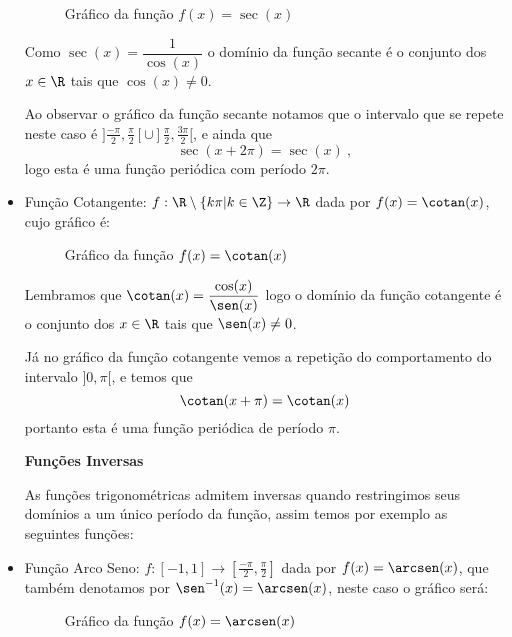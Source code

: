 \begin{itemize}
  \begin{figure}[H]
  \centering
    \caption{Gráfico da função $f(x)= \sec(x)$}
  \end{figure}

  Como $\sec(x)= \dfrac{1}{\cos (x)}$ o domínio da função secante é o conjunto dos $x \in \R$ tais que $\cos(x) \neq 0$.

  Ao observar o gráfico da função secante notamos que o intervalo que se repete neste caso é $]\frac{-\pi}{2}, \frac{\pi}{2}[ \cup ] \frac{\pi}{2}, \frac{3\pi}{2}[$, e ainda que
\begin{equation}
\sec(x + 2\pi)= \sec(x) \ ,
\end{equation}
  logo esta é uma função periódica com período $2\pi$.

  \item Função Cotangente: $f: \R \setminus \{ k\pi | k \in \Z\} \rightarrow \R$ dada por $f(x)= \cotan(x)$, cujo gráfico é:

  \begin{figure}[H]
  \centering
    \caption{Gráfico da função $f(x)= \cotan(x)$}
  \end{figure}

  Lembramos que $\cotan(x)= \dfrac{\cos(x)}{\sen(x)}$ logo o domínio da função cotangente é o conjunto dos $x \in \R$ tais que $\sen(x) \neq 0$.

  Já no gráfico da função cotangente vemos a repetição do comportamento do intervalo $]0, \pi[$, e temos que
\begin{equation}
\cotan(x + \pi)= \cotan(x)
\end{equation}
  portanto esta é uma função periódica de período $\pi$.

  \textbf{Funções Inversas}

  As funções trigonométricas admitem inversas quando restringimos seus domínios a um único período da função, assim temos por exemplo as seguintes funções:

  \item Função Arco Seno: $f: [-1, 1] \rightarrow [\frac{-\pi}{2}, \frac{\pi}{2}]$ dada por $f(x)= \arcsen(x)$, que também denotamos por $\sen^{-1}(x)= \arcsen(x)$, neste caso o gráfico será:

  \begin{figure}[H]
  \centering
    \caption{Gráfico da função $f(x)= \arcsen(x)$}
  \end{figure}



\end{itemize}
